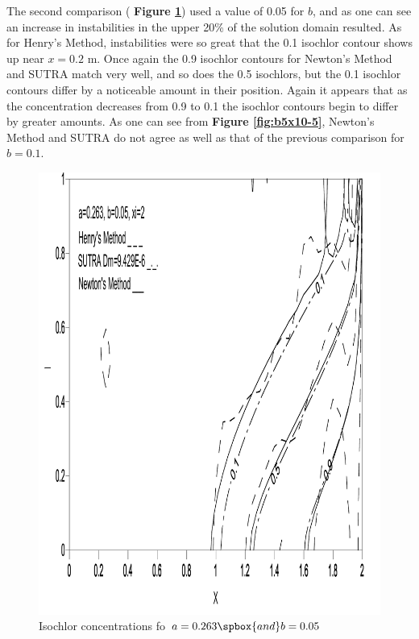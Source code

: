 The second comparison ( \textbf{Figure \ref{fig:b5x10-2}}) used a value of 0.05 for $b$, and as one
can see an increase in instabilities in the upper 20\% of the solution domain resulted. As for
Henry's Method, instabilities were so great that the 0.1 isochlor contour shows up near $x=0.2
\text{ m} $. Once again the 0.9 isochlor contours for Newton's Method and SUTRA match very well, and
so does the 0.5 isochlors, but the 0.1 isochlor contours differ by a noticeable amount in their
position. Again it appears that as the concentration decreases from 0.9 to 0.1 the isochlor contours
begin to differ by greater amounts. As one can see from \textbf{Figure \ref{fig:b5x10-5}}, Newton's
Method and SUTRA do not agree as well as that of the previous comparison for $b=0.1$.

\begin{figure}[htp]
    \centering
    \includegraphics[totalheight=0.45 \textheight,viewport=3mm 4mm 205mm 292mm]
    {image3}
    \caption{Isochlor concentrations fo $a = 0.263 \spbox{and} b =
    0.05$} \label{fig:b5x10-2}
\end{figure}

